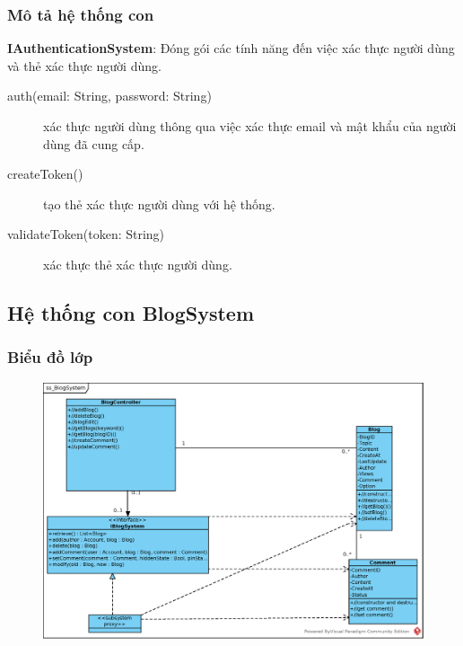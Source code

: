 \documentclass[./../main_file.tex]{subfiles}
\begin{document}
		\subsubsection{Mô tả hệ thống con}
		\textbf{IAuthenticationSystem}: Đóng gói các tính năng đến việc xác thực người dùng và thẻ xác thực người dùng.
		\begin{description}
		\item[auth(email: String, password: String)] xác thực người dùng thông qua việc xác thực email và mật khẩu của người dùng đã cung cấp.
		\item[createToken()] tạo thẻ xác thực người dùng với hệ thống.
		\item[validateToken(token: String)] xác thực thẻ xác thực người dùng.
		\end{description}	
		
	\subsection{Hệ thống con BlogSystem}
		\subsubsection{Biểu đồ lớp}
		\begin{figure}[H]
			\centering
			\includegraphics[width=\linewidth]{./images/ss_BlogSystem.eps}
		\end{figure}
\end{document}
